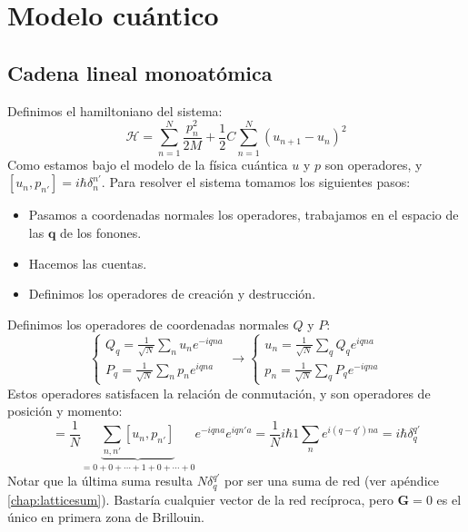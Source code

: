 \section{Modelo cuántico}

\subsection{Cadena lineal monoatómica}
Definimos el hamiltoniano del sistema:
\begin{equation}
  \mathcal{H} = \sum_{n=1}^{N} \frac{p_n^2}{2M} + \frac{1}{2} C
  \sum_{n=1}^{N} (u_{n+1} - u_n)^2
\end{equation}
Como estamos bajo el modelo de la física cuántica $u$ y $p$ son
operadores, y $[u_n, p_{n'}] = i \hbar \delta_n^{n'}$. Para resolver
el sistema tomamos los siguientes pasos:
\begin{itemize}
\item Pasamos a coordenadas normales los operadores, trabajamos en el
espacio de las $\mathbf{q}$ de los fonones.
\item Hacemos las cuentas.
\item Definimos los operadores de creación y destrucción.
\end{itemize}
Definimos los operadores de coordenadas normales $Q$ y $P$:
\begin{equation}
  \begin{cases}
    Q_q = \frac{1}{\sqrt N} \sum_{n}^{ } u_n e^{-iqna} \\
    P_q = \frac{1}{\sqrt N} \sum_{n}^{ } p_n e^{iqna}
  \end{cases} \rightarrow
  \begin{cases}
    u_n = \frac{1}{\sqrt N} \sum_{q}^{ } Q_q e^{iqna} \\
    p_n = \frac{1}{\sqrt N} \sum_{q}^{ } P_q e^{-iqna}
  \end{cases}
\end{equation}
Estos operadores satisfacen la relación de conmutación, y son
operadores de posición y momento:
\begin{equation}
  [Q_q, P_{q'}] = \frac{1}{N}  \underbrace{\sum_{n,n'}^{ }[u_n,
    p_{n'}]}_{= 0 + 0 + \cdots + 1 + 0 + \cdots + 0} e^{-iqna}
  e^{iqn'a} = \frac{1}{N}i \hbar 1 \sum_n e^{i(q-q')na} = i \hbar \delta_q^{q'}
\end{equation}
Notar que la última suma resulta $N\delta_q^{q'}$ por ser una suma de
red (ver apéndice \ref{chap:latticesum}). Bastaría cualquier vector de
la red recíproca, pero $\mathbf{G} = 0$ es el único en primera zona de
Brillouin.

